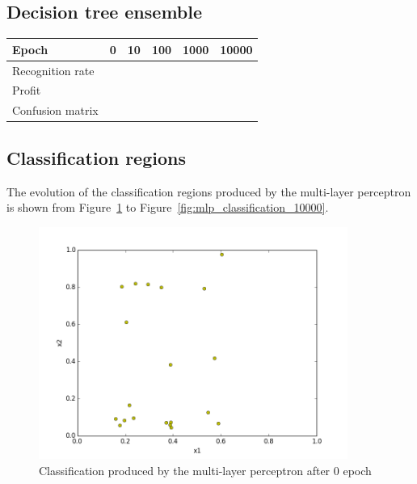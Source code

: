 \documentclass[]{article}
\begin{document}
\subsection{Decision tree ensemble}

\begin{center}
    \begin{tabularx}{\textwidth}{ | X | X | X | X | X | X | }
    \hline
    Epoch & 0 & 10 & 100 & 1000 & 10000 \\ \hline
    Recognition rate & &  &  & &  \\ \hline
    Profit &  &   &  & & \\ \hline
    Confusion matrix  &  &  & & & \\
    \hline
    \end{tabularx}
\end{center}

\subsection{Classification regions}

The evolution of the classification regions produced by the multi-layer perceptron is shown from Figure~\ref{fig:mlp_classification_0} to Figure~\ref{fig:mlp_classification_10000}.

\begin{figure}[h]
    \centering
    \includegraphics[width=0.9\textwidth]{figures/mlp_classification_0.png}
    \caption{Classification produced by the multi-layer perceptron after 0 epoch}
    \label{fig:mlp_classification_0}
\end{figure}
\end{document}
